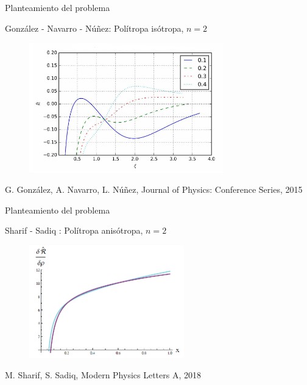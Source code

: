 \documentclass[handout,t]{beamer}
\begin{document}
\begin{frame}{Planteamiento del problema}

\centering González - Navarro - Núñez:  Polítropa isótropa, $n = 2$

\vspace{-2mm}

\begin{figure}[h]
\includegraphics[width=0.75\textwidth]{FracPoliIso.png}
\end{figure}

\vspace{-2mm}

\tiny G. González, A. Navarro, L. Núñez, Journal of Physics: Conference Series, 2015


\end{frame}



\begin{frame}{Planteamiento del problema}

\centering Sharif - Sadiq : Polítropa anisótropa, $n = 2$


\begin{figure}[h]
\includegraphics[width=0.6\textwidth]{Sharif.png}
\end{figure}

\tiny M. Sharif, S. Sadiq, Modern Physics Letters A, 2018


\end{frame}
\end{document}
